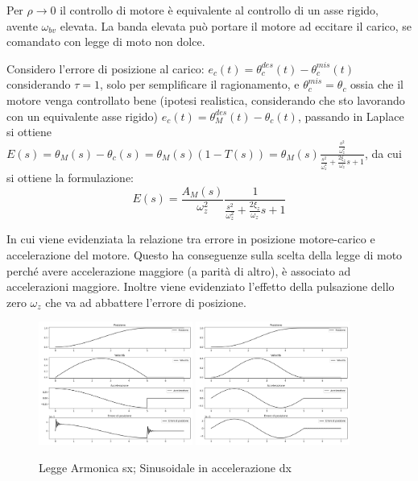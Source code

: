 Per \(\rho \rightarrow 0\) il controllo di motore è equivalente al controllo di un asse rigido, avente \(\omega_{bv}\) elevata. La banda elevata può portare il motore ad eccitare il carico, se comandato con legge di moto non dolce. 

Considero l'errore di posizione al carico: \(e_c(t) = \theta_c^{des}(t) - \theta_c^{mis}(t)\) considerando \(\tau=1\), solo per semplificare il ragionamento, e \(\theta_c^{mis} = \theta_c\) ossia che il motore venga controllato bene (ipotesi realistica, considerando che sto lavorando con un equivalente asse rigido) \(e_c(t) = \theta_M^{des}(t) - \theta_c(t)\), passando in Laplace si ottiene \(E(s) = \theta_M (s) - \theta_c(s) = \theta_M(s) (1 - T(s)) = \theta_M(s) \frac{\frac{s^2}{\omega_z^2}}{\frac{s^2}{\omega_z^2} + \frac{2\xi_z}{\omega_z}s + 1}\), da cui si ottiene la formulazione:
\[
E(s) = \frac{A_M(s)}{\omega_z^2} \frac{1}{\frac{s^2}{\omega_z^2} + \frac{2\xi_z}{\omega_z}s + 1}
\]

In cui viene evidenziata la relazione tra errore in posizione motore-carico e accelerazione del motore. Questo ha conseguenze sulla scelta della legge di moto perché avere accelerazione maggiore (a parità di altro), è associato ad accelerazioni maggiore. Inoltre viene evidenziato l'effetto della pulsazione dello zero \(\omega_z\) che va ad abbattere l'errore di posizione.

\begin{figure}[h]
    \centering
    \includegraphics[width=0.45\textwidth]{Immagini/armonica_colocato_v.png}
    \includegraphics[width=0.45\textwidth]{Immagini/sinusoidale_colocato_v.png}
    \caption{Legge Armonica sx; Sinusoidale in accelerazione dx}
\end{figure}


